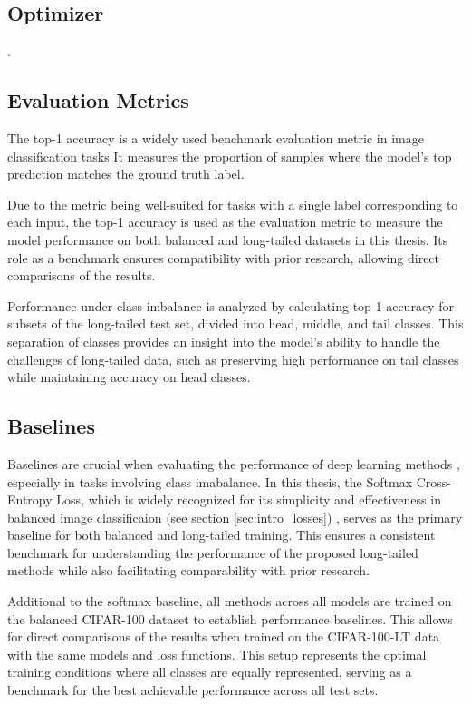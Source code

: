 \subsection{Optimizer}
 \cite{menon2021longtaillearninglogitadjustment,loshchilov2018fixing}. 

\subsection{Evaluation Metrics}
The top-1 accuracy is a widely used benchmark evaluation metric in image classification tasks \cite{zhang2023deep}  It measures the proportion of samples where the model's top prediction matches the ground truth label.

Due to the metric being well-suited for tasks with a single label corresponding to each input, the top-1 accuracy is used as the evaluation metric to measure the model performance on both balanced and long-tailed datasets in this thesis. Its role as a benchmark ensures compatibility with prior research, allowing direct comparisons of the results.

Performance under class imbalance is analyzed by calculating top-1 accuracy for subsets of the long-tailed test set, divided into head, middle, and tail classes. This separation of classes provides an insight into the model's ability to handle the challenges of long-tailed data, such as preserving high performance on tail classes while maintaining accuracy on head classes.


\subsection{Baselines}
Baselines are crucial when evaluating the performance of deep learning methods , especially in tasks involving class imabalance. In this thesis, the Softmax Cross-Entropy Loss, which is widely recognized for its simplicity and effectiveness in balanced image classificaion (see section \ref{sec:intro_losses}) , serves as the primary baseline for both balanced and long-tailed training. This ensures a consistent benchmark for understanding the performance of the proposed long-tailed methods while also facilitating comparability with prior research.

Additional to the softmax baseline, all methods across all models are trained on the balanced CIFAR-100 dataset to establish performance baselines. This allows for direct comparisons of the results when trained on the CIFAR-100-LT data with the same models and loss functions. This setup represents the optimal training conditions where all classes are equally represented, serving as a benchmark for the best achievable performance across all test sets.


